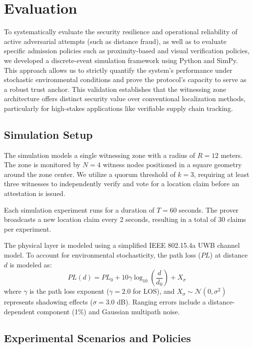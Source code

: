 \section{Evaluation}
\label{sec:evaluation}

To systematically evaluate the security resilience and operational reliability of active adversarial attempts (such as distance fraud), as well as to evaluate specific admission policies such as proximity-based and visual verification policies, we developed a discrete-event simulation framework using Python and SimPy. This approach allows us to strictly quantify the system's performance under stochastic environmental conditions and prove the protocol's capacity to serve as a robust trust anchor. This validation establishes that the witnessing zone architecture offers distinct security value over conventional localization methods, particularly for high-stakes applications like verifiable supply chain tracking.

\subsection{Simulation Setup}

The simulation models a single witnessing zone with a radius of $R=12$ meters. The zone is monitored by $N=4$ witness nodes positioned in a square geometry around the zone center. We utilize a quorum threshold of $k=3$, requiring at least three witnesses to independently verify and vote for a location claim before an attestation is issued.

Each simulation experiment runs for a duration of $T=60$ seconds. The prover broadcasts a new location claim every 2 seconds, resulting in a total of $30$ claims per experiment.

The physical layer is modeled using a simplified IEEE 802.15.4a UWB channel model. To account for environmental stochasticity, the path loss ($PL$) at distance $d$ is modeled as:
\begin{equation}
    PL(d) = PL_0 + 10 \gamma \log_{10}\left(\frac{d}{d_0}\right) + X_\sigma
\end{equation}
where $\gamma$ is the path loss exponent ($\gamma=2.0$ for LOS), and $X_\sigma \sim \mathcal{N}(0, \sigma^2)$ represents shadowing effects ($\sigma=3.0$ dB). Ranging errors include a distance-dependent component (1\%) and Gaussian multipath noise.

\subsection{Experimental Scenarios and Policies}

